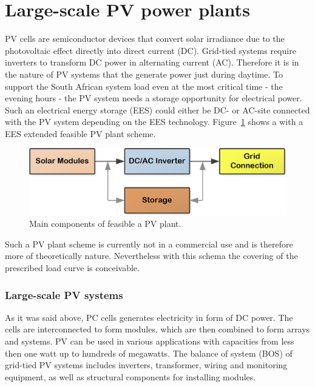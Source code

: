 \section{Large-scale PV power plants}\label{Large scale photo voltaic (PV) power plants}
PV cells are semiconductor devices that convert solar irradiance due to the photovoltaic effect directly into direct current (DC).
Grid-tied systems require inverters to transform DC power in alternating current (AC). Therefore it is in the nature of PV systems that the generate power just during daytime. To support the South African system load even at the most critical time - the evening hours - the PV system needs a storage opportunity for electrical power. Such an electrical energy storage (EES) could either be DC- or AC-site connected with the PV system depending on the EES technology. Figure~\ref{PVMainComp} shows a with a EES extended feasible PV plant scheme.

\begin{figure}[!h] 
\centering
\includegraphics[width=0.75\linewidth]{FIG/PVMainComp}
\caption[Main components of feasible a PV plant.]{Main components of feasible a PV plant.}\label{PVMainComp}
\end{figure}
Such a PV plant scheme is currently not in a commercial use and is therefore more of theoretically nature. Nevertheless with this schema the covering of the prescribed load curve is conceivable.
\subsubsection{Large-scale PV systems}
As it was said above, PC cells generates electricity in form of DC power. The cells are interconnected to form modules, which are then combined to form arrays and systems. PV can be used in various applications with capacities from less then one watt up to hundreds of megawatts. The balance of system (BOS) of grid-tied PV systems includes inverters, transformer, wiring and monitoring equipment, as well as structural components for installing modules.  

